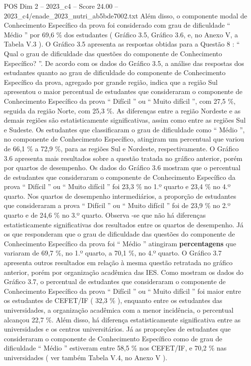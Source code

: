 \begin{textsample}{POS Dim 2 – 2023\_c4 – Score 24.00 – 2023\_c4/enade\_2023\_nutri\_ab5bde7002.txt}
Além disso, o componente modal de Conhecimento Específico da prova foi considerado com grau de dificuldade “ Médio ” por 69,6 \% dos estudantes ( Gráfico 3.5, Gráfico 3.6, e, no Anexo V, a Tabela V.3 ).
O Gráfico 3.5 apresenta as respostas obtidas para a Questão 8 : “ Qual o grau de dificuldade das questões do componente de Conhecimento Específico? ”.
De acordo com os dados do Gráfico 3.5, a análise das respostas dos estudantes quanto ao grau de dificuldade do componente de Conhecimento Específico da prova, agregado por grande região, indica que a região Sul apresentou o maior percentual de estudantes que consideraram o componente de Conhecimento Específico da prova “ Difícil ” ou “ Muito difícil ”, com 27,5 \%, seguida da região Norte, com 25,3 \%.
As diferenças entre a região Nordeste e as demais regiões são estatisticamente significativas, assim como entre as regiões Sul e Sudeste.
Os estudantes que classificaram o grau de dificuldade como “ Médio ”, no componente de Conhecimento Específico, atingiram um percentual que variou de 66,1 \% a 72,9 \%, para as regiões Sul e Nordeste, respectivamente.
O Gráfico 3.6 apresenta mais resultados sobre a questão tratada no gráfico anterior, porém por quartos de desempenho.
Os dados do Gráfico 3.6 mostram que o percentual de estudantes que consideraram o componente de Conhecimento Específico da prova “ Difícil ” ou “ Muito difícil ” foi 23,3 \% no 1.º quarto e 23,4 \% no 4.º quarto.
Nos quartos de desempenho intermediários, a proporção de estudantes que consideraram a prova “ Difícil ” ou “ Muito difícil ” foi de 23,9 \% no 2.º quarto e de 24,6 \% no 3.º quarto.
Observa -se que não há diferenças estatisticamente significativas dos resultados entre os quartos de desempenho.
Já os que responderam que o grau de dificuldade das questões do componente de Conhecimento Específico da prova foi “ Médio ” atingiram \textbf{percentagens} que variaram de 69,7 \%, no 1.º quarto, a 70,1 \%, no 4.º quarto.
O Gráfico 3.7 apresenta outros resultados em relação à mesma questão retratada no gráfico anterior, porém por organização acadêmica das IES.
Como mostram os dados do Gráfico 3.7, o percentual de estudantes que consideraram o componente de Conhecimento Específico da prova “ Difícil ” ou “ Muito difícil ” foi maior entre os estudantes de CEFET/IF ( 32,3 \% ), enquanto entre os estudantes das universidades, a organização acadêmica com a menor incidência, o percentual alcançou 22,7 \%.
Além disso, há diferença estatisticamente significativa entre as universidades e os centros universitários.
Já as proporções de estudantes que consideraram o componente de Conhecimento Específico como de grau de dificuldade “ Médio ” estiveram entre 58,5 \% nos CEFET/IF, e 70,2 \% nas universidades ( ver também Tabela V.4, no Anexo V ).

\end{textsample}
